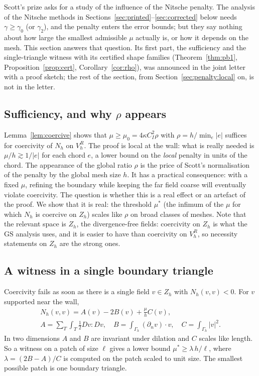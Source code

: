 \documentclass[pdflatex,sn-mathphys-num]{sn-jnl}
\theoremstyle{thmstyleone}
\theoremstyle{thmstylethree}
\newcommand{\Gh}{\Gamma_h}
\newcommand{\VR}{V_h^R}
\newcommand{\Zh}{Z_h}
\newcommand{\dn}{\partial_n}
\newcommand{\GS}{\mathrm{GS}}
\begin{document}
Scott's prize asks for a study of the influence of the Nitsche penalty. The analysis of the Nitsche methods in Sections~\ref{sec:printed}--\ref{sec:corrected} below needs $\gamma\ge\gamma_0$ (or $\gamma_2$), and the penalty enters the error bounds; but they say nothing about how large the smallest admissible $\mu$ actually is, or how it depends on the mesh. This section answers that question. Its first part, the sufficiency and the single-triangle witness with its certified shape families (Theorem~\ref{thm:pb1}, Proposition~\ref{prop:cert}, Corollary~\ref{cor:rho}), was announced in the joint letter \cite{CavalcantePadhiLetter} with a proof sketch; the rest of the section, from Section~\ref{sec:penalty:local} on, is not in the letter.

\subsection{Sufficiency, and why $\rho$ appears}
Lemma~\ref{lem:coercive} shows that $\mu\ge\mu_0=4\kappa C_I^2\rho$ with $\rho=h/\min_e|e|$ suffices for coercivity of $N_h$ on $\VR$. The proof is local at the wall: what is really needed is $\mu/h\gtrsim1/|e|$ for each chord $e$, a lower bound on the \emph{local} penalty in units of the chord. The appearance of the global ratio $\rho$ is the price of Scott's normalisation of the penalty by the global mesh size $h$. It has a practical consequence: with a fixed $\mu$, refining the boundary while keeping the far field coarse will eventually violate coercivity. The question is whether this is a real effect or an artefact of the proof. We show that it is real: the threshold $\mu^\ast$ (the infimum of the $\mu$ for which $N_h$ is coercive on $\Zh$) scales like $\rho$ on broad classes of meshes. Note that the relevant space is $\Zh$, the divergence-free fields: coercivity on $\Zh$ is what the $\GS$ analysis uses, and it is easier to have than coercivity on $\VR$, so necessity statements on $\Zh$ are the strong ones.

\subsection{A witness in a single boundary triangle}
Coercivity fails as soon as there is a single field $v\in\Zh$ with $N_h(v,v)<0$. For $v$ supported near the wall,
\begin{gather*}
N_h(v,v)=A(v)-2B(v)+\frac\mu h C(v),\\
A=\sum_T\int_T\tfrac12Dv:Dv,\quad B=\int_{\Gh}(\dn v)\cdot v,\quad C=\int_{\Gh}|v|^2 .
\end{gather*}
In two dimensions $A$ and $B$ are invariant under dilation and $C$ scales like length. So a witness on a patch of size $\ell$ gives a lower bound $\mu^\ast\ge\lambda\,h/\ell$, where $\lambda=(2B-A)/C$ is computed on the patch scaled to unit size. The smallest possible patch is one boundary triangle.
\end{document}
